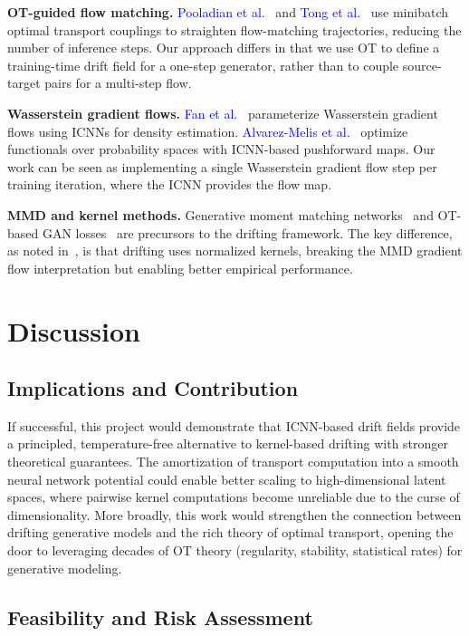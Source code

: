 \documentclass[10pt,conference,compsocconf]{IEEEtran}
\newcommand{\citet}[2]{\textcolor{blue}{#1}~\cite{#2}}
\begin{document}
\textbf{OT-guided flow matching.}
\citet{Pooladian et al.}{pooladian2023multisample} and \citet{Tong et al.}{tong2024improving} use minibatch optimal transport couplings to straighten flow-matching trajectories, reducing the number of inference steps.
Our approach differs in that we use OT to define a training-time drift field for a one-step generator, rather than to couple source-target pairs for a multi-step flow.

\textbf{Wasserstein gradient flows.}
\citet{Fan et al.}{fan2022variational} parameterize Wasserstein gradient flows using ICNNs for density estimation.
\citet{Alvarez-Melis et al.}{alvarez2022optimizing} optimize functionals over probability spaces with ICNN-based pushforward maps.
Our work can be seen as implementing a single Wasserstein gradient flow step per training iteration, where the ICNN provides the flow map.

\textbf{MMD and kernel methods.}
Generative moment matching networks~\cite{li2015generative} and OT-based GAN losses~\cite{salimans2018improving,genevay2018learning} are precursors to the drifting framework.
The key difference, as noted in~\cite{deng2026drifting}, is that drifting uses normalized kernels, breaking the MMD gradient flow interpretation but enabling better empirical performance.


\section{Discussion}

\subsection{Implications and Contribution}

If successful, this project would demonstrate that ICNN-based drift fields provide a principled, temperature-free alternative to kernel-based drifting with stronger theoretical guarantees.
The amortization of transport computation into a smooth neural network potential could enable better scaling to high-dimensional latent spaces, where pairwise kernel computations become unreliable due to the curse of dimensionality.
More broadly, this work would strengthen the connection between drifting generative models and the rich theory of optimal transport, opening the door to leveraging decades of OT theory (regularity, stability, statistical rates) for generative modeling.


\subsection{Feasibility and Risk Assessment}
\end{document}
